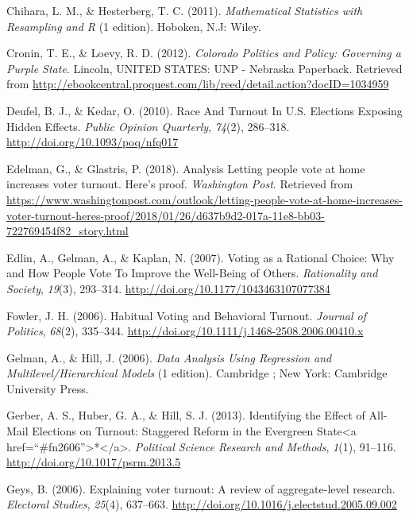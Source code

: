 \documentclass[12pt,twoside]{reedthesis}
\begin{document}
  \hypertarget{ref-chihara_mathematical_2011}{}
  Chihara, L. M., \& Hesterberg, T. C. (2011). \emph{Mathematical
  Statistics with Resampling and R} (1 edition). Hoboken, N.J: Wiley.
  
  \hypertarget{ref-cronin_colorado_2012}{}
  Cronin, T. E., \& Loevy, R. D. (2012). \emph{Colorado Politics and
  Policy: Governing a Purple State}. Lincoln, UNITED STATES: UNP -
  Nebraska Paperback. Retrieved from
  \url{http://ebookcentral.proquest.com/lib/reed/detail.action?docID=1034959}
  
  \hypertarget{ref-deufel_race_2010}{}
  Deufel, B. J., \& Kedar, O. (2010). Race And Turnout In U.S. Elections
  Exposing Hidden Effects. \emph{Public Opinion Quarterly}, \emph{74}(2),
  286--318. \url{http://doi.org/10.1093/poq/nfq017}
  
  \hypertarget{ref-edelman_analysis_2018}{}
  Edelman, G., \& Glastris, P. (2018). Analysis Letting people vote at
  home increases voter turnout. Here's proof. \emph{Washington Post}.
  Retrieved from
  \url{https://www.washingtonpost.com/outlook/letting-people-vote-at-home-increases-voter-turnout-heres-proof/2018/01/26/d637b9d2-017a-11e8-bb03-722769454f82_story.html}
  
  \hypertarget{ref-edlin_voting_2007}{}
  Edlin, A., Gelman, A., \& Kaplan, N. (2007). Voting as a Rational
  Choice: Why and How People Vote To Improve the Well-Being of Others.
  \emph{Rationality and Society}, \emph{19}(3), 293--314.
  \url{http://doi.org/10.1177/1043463107077384}
  
  \hypertarget{ref-fowler_habitual_2006}{}
  Fowler, J. H. (2006). Habitual Voting and Behavioral Turnout.
  \emph{Journal of Politics}, \emph{68}(2), 335--344.
  \url{http://doi.org/10.1111/j.1468-2508.2006.00410.x}
  
  \hypertarget{ref-gelman_data_2006}{}
  Gelman, A., \& Hill, J. (2006). \emph{Data Analysis Using Regression and
  Multilevel/Hierarchical Models} (1 edition). Cambridge ; New York:
  Cambridge University Press.
  
  \hypertarget{ref-gerber_identifying_2013}{}
  Gerber, A. S., Huber, G. A., \& Hill, S. J. (2013). Identifying the
  Effect of All-Mail Elections on Turnout: Staggered Reform in the
  Evergreen State\textless{}a
  href=``\#fn2606''\textgreater{}*\textless{}/a\textgreater{}.
  \emph{Political Science Research and Methods}, \emph{1}(1), 91--116.
  \url{http://doi.org/10.1017/psrm.2013.5}
  
  \hypertarget{ref-geys_explaining_2006}{}
  Geys, B. (2006). Explaining voter turnout: A review of aggregate-level
  research. \emph{Electoral Studies}, \emph{25}(4), 637--663.
  \url{http://doi.org/10.1016/j.electstud.2005.09.002}
  
\end{document}
